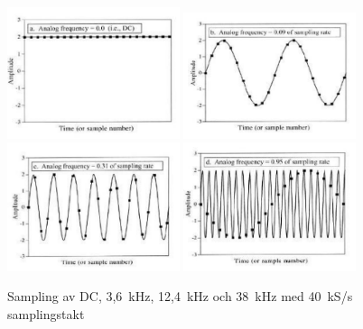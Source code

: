 \begin{figure}
\begin{center}
\includegraphics[width=0.45\textwidth]{images/cropped_pdfs/bild_2_1-38.pdf}
\includegraphics[width=0.45\textwidth]{images/cropped_pdfs/bild_2_1-39.pdf}
\includegraphics[width=0.45\textwidth]{images/cropped_pdfs/bild_2_1-40.pdf}
\includegraphics[width=0.45\textwidth]{images/cropped_pdfs/bild_2_1-41.pdf}
\caption{Sampling av DC, 3,6~kHz, 12,4~kHz och 38~kHz med 40~kS/s samplingstakt}
\label{fig:BildII1-38}
\end{center}
\end{figure}

